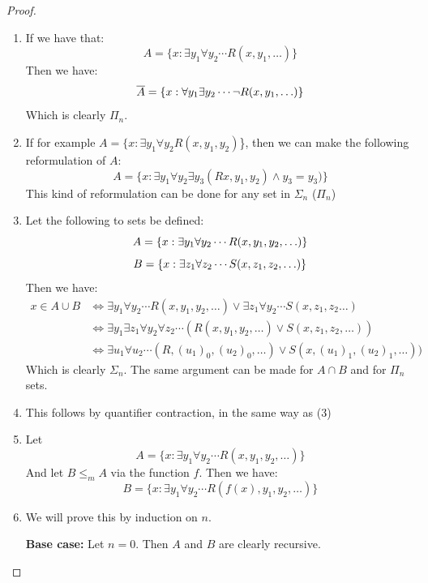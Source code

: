 \documentclass[../main.tex]{subfiles}
\begin{document}
\begin{proof}
	\begin{enumerate}
		\item If we have that:
			\[
				A=\{x:\exists y_1\forall y_2\cdots
				R(x,y_1,\ldots)\}
			\]
			Then we have:
			\[
				\overline A=\{x:\forall y_1\exists y_2\cdots
				\neg R(x,y_1,\ldots)\}
			\]
			Which is clearly $\Pi_n$.
		\item If for example $A=\{x:\exists y_1\forall y_2
			R(x,y_1,y_2)$\}, then we can make the following
			reformulation of $A$:
			\[
				A=\{x:\exists y_1\forall y_2\exists
				y_3(Rx,y_1,y_2)\wedge y_3=y_3)\}
			\]
			This kind of reformulation can be done for any set in
			$\Sigma_n$ ($\Pi_n$)
		\item Let the following to sets be defined:
			\[
				A=\{x:\exists y_1\forall y_2\cdots
				R(x,y_1,y_2,\ldots)\}\\
			\]
			\[
				B=\{x:\exists  z_1\forall z_2\cdots
				S(x,z_1,z_2,\ldots)\}\\
			\]
			Then we have:
			\begin{align*}
				x\in A\cup B&\Leftrightarrow \exists y_1\forall
				y_2\cdots R(x,y_1,y_2,\ldots)\vee \exists
				z_1\forall y_2\cdots S(x,z_1,z_2\ldots)\\
					    &\Leftrightarrow \exists y_1\exists z_1\forall
				y_2\forall z_2\cdots (R(x,y_1,y_2,\ldots)\vee
				S(x,z_1,z_2,\ldots))\\
					    &\Leftrightarrow \exists u_1\forall
					    u_2\cdots
					    (R,(u_1)_0,(u_2)_0,\ldots)\vee
					    S(x,(u_1)_1,(u_2)_1,\ldots))
			\end{align*}
			Which is clearly $\Sigma_n$. The same argument can be
			made for
			$A\cap B$ and for $\Pi_n$ sets.
		\item This follows by quantifier contraction, in the same way
			as (3)
		\item Let 
			\[ 
				A=\{x:\exists y_1\forall y_2\cdots
				R(x,y_1,y_2,\ldots)\}
			\]
			And let $B\leq_m A$ via the function $f$. Then we have:
			\[
				B=\{ x:\exists y_1\forall y_2\cdots
				R(f(x),y_1,y_2,\ldots)\}
			\]
		\item We will prove this by induction on $n$.

			\textbf{Base case:} Let $n=0$. Then $A$ and $B$ are
			clearly recursive. 


\end{enumerate}
\end{proof}
\end{document}
